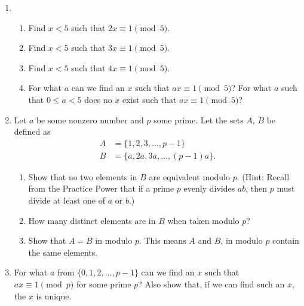 \documentclass[11pt]{article}
\theoremstyle{definition}
\begin{document}
\begin{enumerate} \addtocounter{enumi}{\value{problem_count}}

\item \addtocounter{problem_count}{1}
\begin{enumerate}
\item Find $x < 5$ such that $2x \equiv 1 \pmod 5$.

\item Find $x < 5$ such that $3x \equiv 1 \pmod 5$.

\item Find $x < 5$ such that $4x \equiv 1 \pmod 5$.

\item For what $a$ can we find an $x$ such that $ax \equiv 1 \pmod{5}$? For what $a$ such that $0 \le a < 5$ does no $x$ exist such that $ax \equiv 1 \pmod{5}$?

\end{enumerate}

\item \addtocounter{problem_count}{1}
Let $a$ be some nonzero number and $p$ some prime. Let the sets $A$, $B$ be defined as
\begin{align*}
A &= \{1, 2, 3,\ldots, p-1\} \\
B &= \{a, 2a, 3a, \ldots, (p-1)a\}.
\end{align*}
\begin{enumerate}
\item Show that no two elements in $B$ are equivalent modulo $p$. (Hint: Recall from the Practice Power that if a prime $p$ evenly divides $ab$, then $p$ must divide at least one of $a$ or $b$.)

\item How many distinct elements are in $B$ when taken modulo $p$?

\item Show that $A = B$ in modulo $p$. This means $A$ and $B$, in modulo $p$ contain the same elements.

\end{enumerate}


\item \addtocounter{problem_count}{1}
For what $a$ from $\{0, 1, 2, \ldots, p - 1\}$ can we find an $x$ such that $ax \equiv 1 \pmod{p}$ for some prime $p$? Also show that, if we can find such an $x$, the $x$ is unique.

\end{enumerate}
\end{document}
